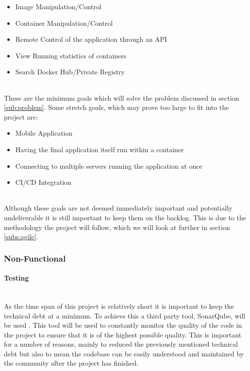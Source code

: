 \begin{itemize}
  \item Image Manipulation/Control
  \item Container Manipulation/Control
  \item Remote Control of the application through an API
  \item View Running statistics of containers
  \item Search Docker Hub/Private Registry 
\end{itemize}
\mbox{}\\
These are the minimum goals which will solve the problem discussed in section \ref{sub:problem}. Some stretch goals, which may prove too large to fit into the project are:
\mbox{}\\
\begin{itemize}
  \item Mobile Application
  \item Having the final application itself run within a container
  \item Connecting to multiple servers running the application at once
  \item CI/CD Integration
\end{itemize}
\mbox{}\\
Although these goals are not deemed immediately important and potentially undeliverable it is still important to keep them on the backlog. This is due to the methodology the project will follow, which we will look at further in section \ref{subs:agile}.

\subsubsection{Non-Functional}

\paragraph{Testing}\mbox{}\\
As the time span of this project is relatively short it is important to keep the \gls{technical debt} at a minimum. To achieve this a third party tool, SonarQube, will be used \citep{Sonar2016}. This tool will be used to constantly monitor the quality of the code in the project to ensure that it is of the highest possible quality. This is important for a number of reasons, mainly to reduced the previously mentioned technical debt but also to mean the codebase can be easily understood and maintained by the community after the project has finished. 

